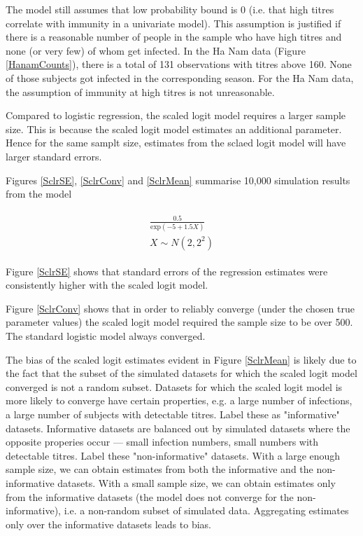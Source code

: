 The model still assumes that low probability bound is 0 (i.e. that high titres correlate with immunity in a univariate model). This assumption is justified if there is a reasonable number of people in the sample who have high titres and none (or very few) of whom get infected. In the Ha Nam data (Figure \ref{HanamCounts}), there is a total of 131 observations with titres above 160. None of those subjects got infected in the corresponding season. For the Ha Nam data, the assumption of immunity at high titres is not unreasonable.

Compared to logistic regression, the scaled logit model requires a larger sample size. This is because the scaled logit model estimates an additional parameter. Hence for the same samplt size, estimates from the sclaed logit model will have larger standard errors.

Figures \ref{SclrSE}, \ref{SclrConv} and \ref{SclrMean} summarise 10,000 simulation results from the model

\begin{align*}
	\begin{gathered}
		\frac{0.5}{\text{exp}(-5 + 1.5 X)} \\
		X \sim N(2, 2^2)
	\end{gathered}
\end{align*}

Figure \ref{SclrSE} shows that standard errors of the regression estimates were consistently higher with the scaled logit model.

Figure \ref{SclrConv} shows that in order to reliably converge (under the chosen true parameter values) the scaled logit model required the sample size to be over 500. The standard logistic model always converged.

The bias of the scaled logit estimates evident in Figure \ref{SclrMean} is likely due to the fact that the subset of the simulated datasets for which the scaled logit model converged is not a random subset. Datasets for which the scaled logit model is more likely to converge have certain properties, e.g. a large number of infections, a large number of subjects with detectable titres. Label these as "informative" datasets. Informative datasets are balanced out by simulated datasets where the opposite properies occur --- small infection numbers, small numbers with detectable titres. Label these "non-informative" datasets. With a large enough sample size, we can obtain estimates from both the informative and the non-informative datasets. With a small sample size, we can obtain estimates only from the informative datasets (the model does not converge for the non-informative), i.e. a non-random subset of simulated data. Aggregating estimates only over the informative datasets leads to bias.

